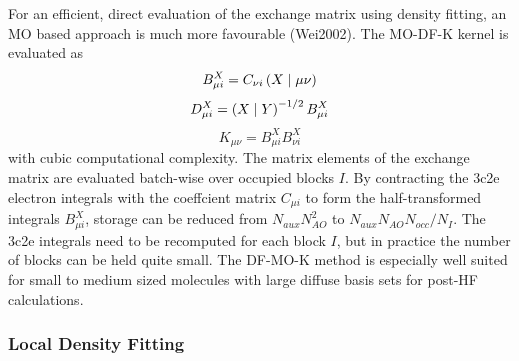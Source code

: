 For an efficient, direct evaluation of the exchange matrix using density fitting, an MO based approach is much more favourable (Wei2002). The MO-DF-K kernel is evaluated as
\begin{equation}
B^{X}_{\mu i} = C_{\nu i} \left( X \mid \mu\nu \right)
\end{equation} 
\begin{equation}
D^{X}_{\mu i} = \left( X \mid Y \right)^{-1/2} B^{X}_{\mu i}
\end{equation}
\begin{equation}
K_{\mu\nu} = B^{X}_{\mu i} B^{X}_{\nu i}
\end{equation}
\noindent with cubic computational complexity. The matrix elements of the exchange matrix are evaluated batch-wise over occupied blocks $I$. By contracting the 3c2e electron integrals with the coeffcient matrix $C_{\mu i}$ to form the half-transformed integrals $B^X_{\mu i}$, storage can be reduced from $N_{aux} N_{AO}^2$ to $N_{aux} N_{AO} N_{occ} / N_I$. The 3c2e integrals need to be recomputed for each block $I$, but in practice the number of blocks can be held quite small. The DF-MO-K method is especially well suited for small to medium sized molecules with large diffuse basis sets for post-HF calculations.      


\subsubsection{Local Density Fitting}

